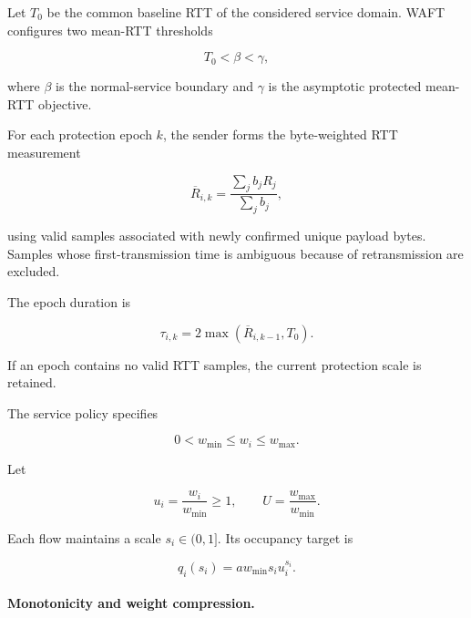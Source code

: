 Let \(T_0\) be the common baseline RTT of the considered service domain. WAFT configures two mean-RTT thresholds

\begin{equation}
\label{eq:app-f-1}
T_0<\beta<\gamma,
\end{equation}

where \(\beta\) is the normal-service boundary and \(\gamma\) is the asymptotic protected mean-RTT objective.

For each protection epoch \(k\), the sender forms the byte-weighted RTT measurement

\begin{equation}
\label{eq:app-f-2}
\overline R_{i,k}
=
\frac{\sum_jb_jR_j}{\sum_jb_j},
\end{equation}

using valid samples associated with newly confirmed unique payload bytes. Samples whose first-transmission time is ambiguous because of retransmission are excluded.

The epoch duration is

\begin{equation}
\label{eq:app-f-3}
\tau_{i,k}=2\max(\overline R_{i,k-1},T_0).
\end{equation}

If an epoch contains no valid RTT samples, the current protection scale is retained.

The service policy specifies

\begin{equation}
\label{eq:app-f-4}
0<w_{\min}\le w_i\le w_{\max}.
\end{equation}

Let

\begin{equation}
\label{eq:app-f-5}
u_i=\frac{w_i}{w_{\min}}\ge1,
\qquad
U=\frac{w_{\max}}{w_{\min}}.
\end{equation}

Each flow maintains a scale \(s_i\in(0,1]\). Its occupancy target is

\begin{equation}
\label{eq:app-f-6}
\boxed{
q_i(s_i)=aw_{\min}s_i u_i^{s_i}.
}
\end{equation}

\paragraph{Monotonicity and weight compression.}

